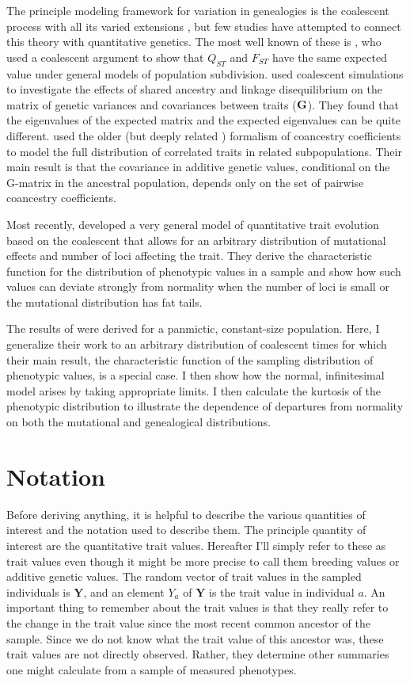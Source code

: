 \documentclass{article}
\begin{document}
The principle modeling framework for variation in genealogies is the coalescent
process with all its varied extensions \citep{Wakeley2008}, but few studies have
attempted to connect this theory with quantitative genetics. The most well known
of these is \citet{Whitlock1999}, who used a coalescent argument to show that
$Q_{ST}$ and $F_{ST}$ have the same expected value under general models of
population subdivision. \citet{Griswold2007} used coalescent simulations to
investigate the effects of shared ancestry and linkage disequilibrium on the
matrix of genetic variances and covariances between traits
($\mbox{\textbf{G}}$). They found that the eigenvalues of the expected matrix
and the expected eigenvalues can be quite different. \citet{Ovaskainen2011} used the
older (but deeply related \citep{Tavare1984}) formalism of coancestry
coefficients to model the full distribution of correlated traits in related
subpopulations. Their main result is that the covariance in additive genetic
values, conditional on the G-matrix in the ancestral population, depends only on
the set of pairwise coancestry coefficients.

Most recently, \citet{Schraiber2015} developed a very general model of
quantitative trait evolution based on the coalescent that allows for an
arbitrary distribution of mutational effects and number of loci affecting the
trait. They derive the characteristic function for the distribution of
phenotypic values in a sample and show how such values can deviate strongly from
normality when the number of loci is small or the mutational distribution has
fat tails.

The results of \citet{Schraiber2015} were derived for a panmictic, constant-size
population. Here, I generalize their work to an arbitrary distribution of
coalescent times for which their main result, the characteristic function of the
sampling distribution of phenotypic values, is a special case. I then show how
the normal, infinitesimal model arises by taking appropriate limits. I then
calculate the kurtosis of the phenotypic distribution to illustrate the
dependence of departures from normality on both the mutational and genealogical
distributions.

\section{Notation}
Before deriving anything, it is helpful to describe the various quantities of
interest and the notation used to describe them. The principle quantity of
interest are the quantitative trait values. Hereafter I'll simply refer to these
as trait values even though it might be more precise to call them breeding
values or additive genetic values. The random vector of trait values in the
sampled individuals is $\mathbf{Y}$, and an element $Y_a$ of $\mathbf{Y}$ is the
trait value in individual $a$. An important thing to remember about the trait
values is that they really refer to the change in the trait value since the most
recent common ancestor of the sample. Since we do not know what the trait value
of this ancestor was, these trait values are not directly observed. Rather, they
determine other summaries one might calculate from a sample of measured
phenotypes.
\end{document}

